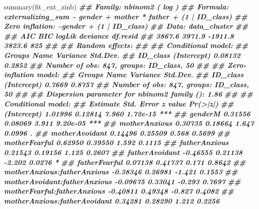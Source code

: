 \documentclass[
]{book}
\newenvironment{Shaded}{\begin{snugshade}}{\end{snugshade}}
\newcommand{\DocumentationTok}[1]{\textcolor[rgb]{0.56,0.35,0.01}{\textbf{\textit{#1}}}}
\newcommand{\FunctionTok}[1]{\textcolor[rgb]{0.00,0.00,0.00}{#1}}
\newcommand{\NormalTok}[1]{#1}
\begin{document}
\begin{Shaded}
\begin{Highlighting}[]
\FunctionTok{summary}\NormalTok{(fit\_ext\_zinb)}
\DocumentationTok{\#\#  Family: nbinom2  ( log )}
\DocumentationTok{\#\# Formula:          externalizing\_sum \textasciitilde{} gender + mother * father + (1 | ID\_class)}
\DocumentationTok{\#\# Zero inflation:                     \textasciitilde{}gender + (1 | ID\_class)}
\DocumentationTok{\#\# Data: data\_cluster}
\DocumentationTok{\#\# }
\DocumentationTok{\#\#      AIC      BIC   logLik deviance df.resid }
\DocumentationTok{\#\#   3867.6   3971.9  {-}1911.8   3823.6      825 }
\DocumentationTok{\#\# }
\DocumentationTok{\#\# Random effects:}
\DocumentationTok{\#\# }
\DocumentationTok{\#\# Conditional model:}
\DocumentationTok{\#\#  Groups   Name        Variance Std.Dev.}
\DocumentationTok{\#\#  ID\_class (Intercept) 0.08132  0.2852  }
\DocumentationTok{\#\# Number of obs: 847, groups:  ID\_class, 50}
\DocumentationTok{\#\# }
\DocumentationTok{\#\# Zero{-}inflation model:}
\DocumentationTok{\#\#  Groups   Name        Variance Std.Dev.}
\DocumentationTok{\#\#  ID\_class (Intercept) 0.7669   0.8757  }
\DocumentationTok{\#\# Number of obs: 847, groups:  ID\_class, 50}
\DocumentationTok{\#\# }
\DocumentationTok{\#\# Dispersion parameter for nbinom2 family (): 1.86 }
\DocumentationTok{\#\# }
\DocumentationTok{\#\# Conditional model:}
\DocumentationTok{\#\#                               Estimate Std. Error z value Pr(\textgreater{}|z|)    }
\DocumentationTok{\#\# (Intercept)                    1.01996    0.12814   7.960 1.72e{-}15 ***}
\DocumentationTok{\#\# genderM                        0.31556    0.08069   3.911 9.20e{-}05 ***}
\DocumentationTok{\#\# motherAnxious                  0.30735    0.18664   1.647   0.0996 .  }
\DocumentationTok{\#\# motherAvoidant                 0.14496    0.25509   0.568   0.5699    }
\DocumentationTok{\#\# motherFearful                  0.62950    0.39550   1.592   0.1115    }
\DocumentationTok{\#\# fatherAnxious                  0.21543    0.19156   1.125   0.2607    }
\DocumentationTok{\#\# fatherAvoidant                {-}0.46555    0.21138  {-}2.202   0.0276 *  }
\DocumentationTok{\#\# fatherFearful                  0.07138    0.41737   0.171   0.8642    }
\DocumentationTok{\#\# motherAnxious:fatherAnxious   {-}0.38346    0.26981  {-}1.421   0.1553    }
\DocumentationTok{\#\# motherAvoidant:fatherAnxious  {-}0.09675    0.33041  {-}0.293   0.7697    }
\DocumentationTok{\#\# motherFearful:fatherAnxious   {-}0.40811    0.49348  {-}0.827   0.4082    }
\DocumentationTok{\#\# motherAnxious:fatherAvoidant   0.34281    0.28290   1.212   0.2256    }

\end{Highlighting}
\end{Shaded}
\end{document}
